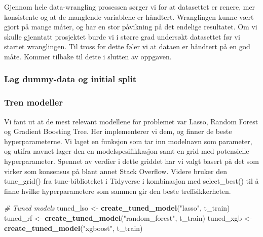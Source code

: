 \documentclass[
]{article}
\newenvironment{Shaded}{\begin{snugshade}}{\end{snugshade}}
\newcommand{\CommentTok}[1]{\textcolor[rgb]{0.56,0.35,0.01}{\textit{#1}}}
\newcommand{\FunctionTok}[1]{\textcolor[rgb]{0.13,0.29,0.53}{\textbf{#1}}}
\newcommand{\NormalTok}[1]{#1}
\newcommand{\OtherTok}[1]{\textcolor[rgb]{0.56,0.35,0.01}{#1}}
\newcommand{\SpecialCharTok}[1]{\textcolor[rgb]{0.81,0.36,0.00}{\textbf{#1}}}
\newcommand{\StringTok}[1]{\textcolor[rgb]{0.31,0.60,0.02}{#1}}
\begin{document}
Gjennom hele data-wrangling prosessen sørger vi for at datasettet er
renere, mer konsistente og at de manglende variablene er håndtert.
Wranglingen kunne vært gjort på mange måter, og har en stor påvikning på
det endelige resultatet. Om vi skulle gjenntatt prosjektet burde vi i
større grad undersøkt datasettet før vi startet wranglingen. Til tross
for dette føler vi at dataen er håndtert på en god måte. Kommer tilbake
til dette i slutten av oppgaven.

\subsubsection{Lag dummy-data og initial
split}\label{lag-dummy-data-og-initial-split}

\begin{Shaded}
\end{Shaded}

\subsubsection{Tren modeller}\label{tren-modeller}

Vi fant ut at de mest relevant modellene for problemet var Lasso, Random
Forest og Gradient Boosting Tree. Her implementerer vi dem, og finner de
beste hyperparameterne. Vi laget en funksjon som tar inn modelnavn som
parameter, og utifra navnet lager den en modelspesifikkasjon samt en
grid med potensielle hyperparameter. Spennet av verdier i dette griddet
har vi valgt basert på det som virker som konsensus på blant annet Stack
Overflow. Videre bruker den tune\_grid() fra tune-biblioteket i
Tidyverse i kombinasjon med select\_best() til å finne hvilke
hyperparametere som sammen gir den beste treffsikkerheten.

\begin{Shaded}
\begin{Highlighting}[]
\CommentTok{\# Tuned models}
\NormalTok{tuned\_lso }\OtherTok{\textless{}{-}} \FunctionTok{create\_tuned\_model}\NormalTok{(}\StringTok{"lasso"}\NormalTok{, t\_train) }
\NormalTok{tuned\_rf }\OtherTok{\textless{}{-}} \FunctionTok{create\_tuned\_model}\NormalTok{(}\StringTok{"random\_forest"}\NormalTok{, t\_train) }
\NormalTok{tuned\_xgb }\OtherTok{\textless{}{-}} \FunctionTok{create\_tuned\_model}\NormalTok{(}\StringTok{"xgboost"}\NormalTok{, t\_train) }
\end{Highlighting}
\end{Shaded}
\end{document}

